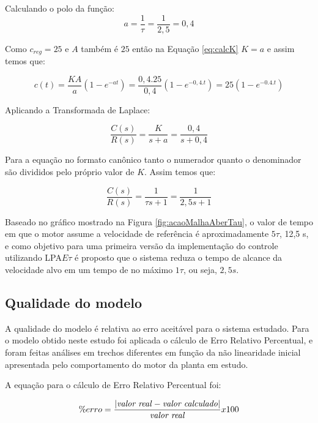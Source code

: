 Calculando o polo da função:
\begin{equation}
  a = \frac{1}{\tau} = \frac{1}{2,5} = 0,4
\end{equation}

Como $c_{reg} = 25$ e $A$ também é $25$ então na Equação \ref{eq:calcK} $K = a$ e assim temos que:

\begin{equation}
c(t) = \frac{KA}{a}(1-e^{-at}) = \frac{0,4.25}{0,4}(1-e^{-0,4.t}) = 25(1-e^{-0.4.t})
\end{equation}


Aplicando a Transformada de Laplace:

\begin{equation}
  \frac{C(s)}{R(s)} = \frac{K}{s+a} = \frac{0,4}{s+0,4}
\end{equation}


Para a equação no formato canônico tanto o numerador quanto o denominador são divididos pelo próprio valor de $K$. Assim temos que:

\begin{equation}
  \frac{C(s)}{R(s)} = \frac{1}{\tau s+1} = \frac{1}{2,5 s+1}
\end{equation}


Baseado no gráfico mostrado na Figura \ref{fig:acaoMalhaAberTau}, o valor de tempo em que o motor assume a velocidade de referência é aproximadamente $5\tau$, 12,5 s, e como objetivo para uma primeira versão da implementação do controle utilizando LPA$E\tau$ é proposto que o sistema reduza o tempo de alcance da velocidade alvo em um tempo de no máximo $1\tau$, ou seja, $2,5 s$.



\subsection*{ Qualidade do modelo }

A qualidade do modelo é relativa ao erro aceitável para o sistema estudado. Para o modelo obtido neste estudo foi aplicada o cálculo de Erro Relativo Percentual, e foram feitas análises em trechos diferentes em função da não linearidade inicial apresentada pelo comportamento do motor da planta em estudo.

A equação para o cálculo de Erro Relativo Percentual foi:

\begin{equation}
 \% erro = \frac{| \text{\emph{valor real}} -\text{\emph{valor calculado}} |}{\text{\emph{valor real}}} x 100
\end{equation}

